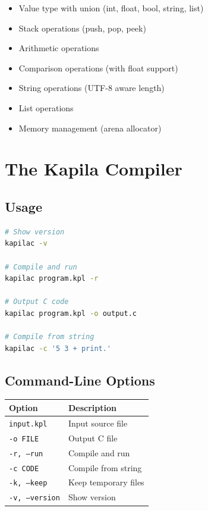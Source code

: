 \documentclass[11pt,a4paper]{report}
\begin{document}
\begin{itemize}
    \item Value type with union (int, float, bool, string, list)
    \item Stack operations (push, pop, peek)
    \item Arithmetic operations
    \item Comparison operations (with float support)
    \item String operations (UTF-8 aware length)
    \item List operations
    \item Memory management (arena allocator)
\end{itemize}

\chapter{The Kapila Compiler}

\section{Usage}

\begin{lstlisting}[language=bash]
# Show version
kapilac -v

# Compile and run
kapilac program.kpl -r

# Output C code
kapilac program.kpl -o output.c

# Compile from string
kapilac -c '5 3 + print.'
\end{lstlisting}

\section{Command-Line Options}

\begin{tabular}{ll}
\toprule
Option & Description \\
\midrule
\texttt{input.kpl} & Input source file \\
\texttt{-o FILE} & Output C file \\
\texttt{-r, --run} & Compile and run \\
\texttt{-c CODE} & Compile from string \\
\texttt{-k, --keep} & Keep temporary files \\
\texttt{-v, --version} & Show version \\
\bottomrule
\end{tabular}
\end{document}
